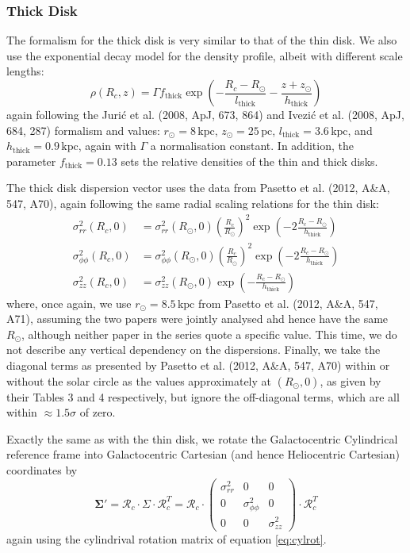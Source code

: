 \documentclass[fleqn,usenatbib]{mnras}
\begin{document}
\subsubsection{Thick Disk}
The formalism for the thick disk is very similar to that of the thin disk. We also use the exponential decay model for the density profile, albeit with different scale lengths:
\begin{equation}
    \rho(R_c, z) = \Gamma f_\mathrm{thick}\exp\left(-\frac{R_c - R_\odot}{l_\mathrm{thick}} - \frac{z + z_\odot}{h_\mathrm{thick}}\right)
\end{equation}
again following the Juri\'{c} et al. (2008, ApJ, 673, 864) and Ivezi\'{c} et al. (2008, ApJ, 684, 287) formalism and values: $r_\odot = 8\,\mathrm{kpc}$, $z_\odot = 25\,\mathrm{pc}$, $l_\mathrm{thick} = 3.6\,\mathrm{kpc}$, and $h_\mathrm{thick} = 0.9\,\mathrm{kpc}$, again with $\Gamma$ a normalisation constant. In addition, the parameter $f_\mathrm{thick} = 0.13$ sets the relative densities of the thin and thick disks.

The thick disk dispersion vector uses the data from Pasetto et al. (2012, A\&A, 547, A70), again following the same radial scaling relations for the thin disk:
\begin{align}
    \sigma_{rr}^2(R_c, 0) &= \sigma_{rr}^2(R_\odot, 0) \left(\frac{R_c}{R_\odot}\right)^2 \exp\left(-2\frac{R_c - R_\odot}{h_\mathrm{thick}}\right) \\
    \sigma_{\phi\phi}^2(R_c, 0) &= \sigma_{\phi\phi}^2(R_\odot, 0) \left(\frac{R_c}{R_\odot}\right)^2 \exp\left(-2\frac{R_c - R_\odot}{h_\mathrm{thick}}\right) \\
    \sigma_{zz}^2(R_c, 0) &= \sigma_{zz}^2(R_\odot, 0) \exp\left(-\frac{R_c - R_\odot}{h_\mathrm{thick}}\right)
\end{align}
where, once again, we use $r_\odot = 8.5\,\mathrm{kpc}$ from Pasetto et al. (2012, A\&A, 547, A71), assuming the two papers were jointly analysed ahd hence have the same $R_\odot$, although neither paper in the series quote a specific value. This time, we do not describe any vertical dependency on the dispersions. Finally, we take the diagonal terms as presented by Pasetto et al. (2012, A\&A, 547, A70) within or without the solar circle as the values approximately at $(R_\odot, 0)$, as given by their Tables 3 and 4 respectively, but ignore the off-diagonal terms, which are all within $\approx1.5\sigma$ of zero.

Exactly the same as with the thin disk, we rotate the Galactocentric Cylindrical reference frame into Galactocentric Cartesian (and hence Heliocentric Cartesian) coordinates by
\begin{equation}
    \bm{\Sigma}{'} = \bm{\mathcal{R}}_c \cdot \Sigma \cdot \bm{\mathcal{R}}_c^T = \bm{\mathcal{R}}_c \cdot \left(\begin{matrix} \sigma_{rr}^2 & 0 & 0 \\ 0 & \sigma_{\phi\phi}^2 & 0 \\ 0 & 0 & \sigma_{zz}^2 \end{matrix}\right) \cdot \bm{\mathcal{R}}_c^T
\end{equation}
again using the cylindrival rotation matrix of equation \ref{eq:cylrot}.
\end{document}
